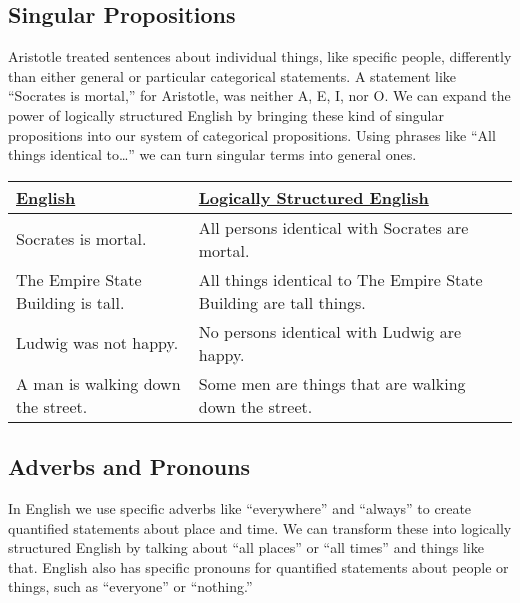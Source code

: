 \subsection{Singular Propositions}
\label{subsec:singular_propositions}
Aristotle treated sentences about individual things, like specific people, differently than either general or particular categorical statements. A statement like ``Socrates is mortal,'' for Aristotle, was neither A, E, I, nor O. We can expand the power of logically structured English by bringing these kind of singular propositions into our system of categorical propositions. Using phrases like ``All things identical to\ldots'' we can turn singular terms into general ones. 

\begin{longtabu}{p{.5\linewidth}p{.5\linewidth}}
\underline{English} &
\underline{Logically Structured English} \\
\endhead 
Socrates is mortal.&
All persons identical with Socrates are mortal. \\

The Empire State Building is tall. &
All things identical to The Empire State Building are tall things. \\

Ludwig was not happy. &
No persons identical with Ludwig are happy. \\

A man is walking down the street. &
Some men are things that are walking down the street.
\end{longtabu}

\subsection{Adverbs and Pronouns}

In English we use specific adverbs like ``everywhere'' and ``always'' to create quantified statements about place and time. We can transform these into logically structured English by talking about ``all places'' or ``all times''  and things like that. English also has specific pronouns for quantified statements about people or things, such as ``everyone'' or ``nothing.'' 


